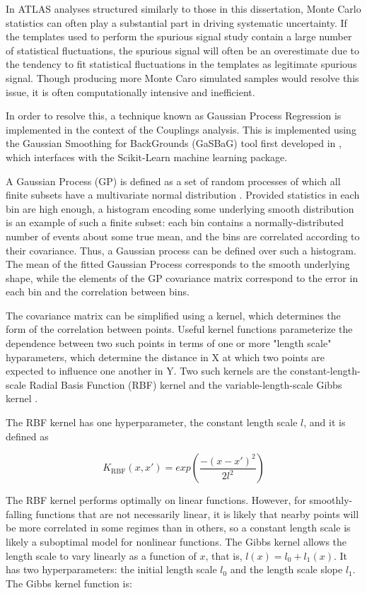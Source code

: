 In ATLAS analyses structured similarly to those in this dissertation, Monte Carlo statistics can often play a substantial part in driving systematic uncertainty. If the templates used to perform the spurious signal study contain a large number of statistical fluctuations, the spurious signal will often be an overestimate due to the tendency to fit statistical fluctuations in the templates as legitimate spurious signal. Though producing more Monte Caro simulated samples would resolve this issue, it is often computationally intensive and inefficient.

In order to resolve this, a technique known as Gaussian Process Regression is implemented in the context of the Couplings analysis. This is implemented using the Gaussian Smoothing for BackGrounds (GaSBaG) tool first developed in \cite{Hyneman}, which interfaces with the Scikit-Learn \cite{scikit-learn} machine learning package.

A Gaussian Process (GP) is defined as a set of random processes of which all finite subsets have a multivariate normal distribution \cite{ebden2015gaussian}. Provided statistics in each bin are high enough, a histogram encoding some underlying smooth distribution is an example of such a finite subset: each bin contains a normally-distributed number of events about some true mean, and the bins are correlated according to their covariance. Thus, a Gaussian process can be defined over such a histogram. The mean of the fitted Gaussian Process corresponds to the smooth underlying shape, while the elements of the GP covariance matrix correspond to the error in each bin and the correlation between bins.

The covariance matrix can be simplified using a kernel, which determines the form of the correlation between points. Useful kernel functions parameterize the dependence between two such points in terms of one or more "length scale" hyparameters, which determine the distance in X at which two points are expected to influence one another in Y. Two such kernels are the constant-length-scale Radial Basis Function (RBF) kernel \cite{3569} and the variable-length-scale Gibbs kernel \cite{Gibbs}. 

The RBF kernel has one hyperparameter, the constant length scale $l$, and it is defined as

\begin{equation}
K_\text{RBF}(x,x') = exp\left(\frac{-(x-x')^2}{2l^2}\right)
\end{equation}

The RBF kernel performs optimally on linear functions. However, for smoothly-falling functions that are not necessarily linear, it is likely that nearby points will be more correlated in some regimes than in others, so a constant length scale is likely a suboptimal model for nonlinear functions. The Gibbs kernel allows the length scale to vary linearly as a function of $x$, that is, ${l(x)=l_{0}+l_{1}(x)}$. It has two hyperparameters: the initial length scale $l_{0}$ and the length scale slope $l_{1}$. The Gibbs kernel function is: 

